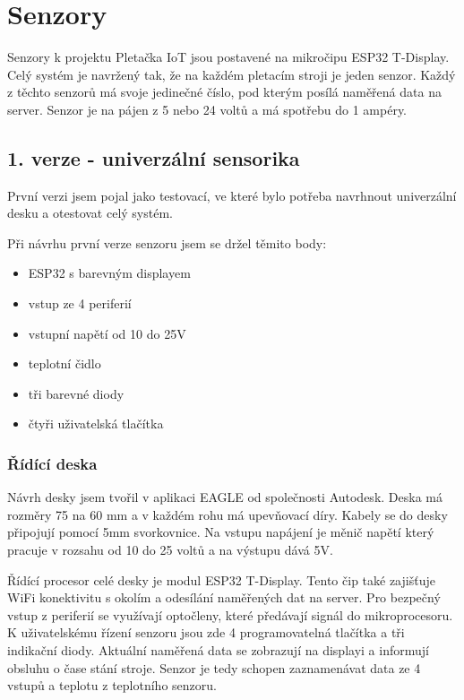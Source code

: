 \chapter{Senzory}

Senzory k projektu Pletačka IoT jsou postavené na mikročipu ESP32 T-Display\cite{ESP32}.
Celý systém je navržený tak, že na každém pletacím stroji je jeden senzor.
Každý z těchto senzorů má svoje jedinečné číslo, pod kterým posílá naměřená data na server.
Senzor je na pájen z 5 nebo 24 voltů a má spotřebu do 1 ampéry.


\section{1. verze - univerzální sensorika}

První verzi jsem pojal jako testovací, ve které bylo potřeba navrhnout univerzální desku a otestovat celý systém.\newline

Při návrhu první verze senzoru jsem se držel těmito body:
\begin{itemize}
    \item ESP32 s barevným displayem
    \item vstup ze 4 periferií
    \item vstupní napětí od 10 do 25V
    \item teplotní čidlo
    \item tři barevné diody
    \item čtyři uživatelská tlačítka
\end{itemize}


\subsection{Řídící deska}
Návrh desky jsem tvořil v aplikaci EAGLE od společnosti Autodesk. 
Deska má rozměry 75 na 60 mm a v každém rohu má upevňovací díry. 
Kabely se do desky připojují pomocí 5mm svorkovnice.
Na vstupu napájení je měnič napětí který pracuje v rozsahu od 10 do 25 voltů a na výstupu dává 5V. 

Řídící procesor celé desky je modul ESP32 T-Display.
Tento čip také zajišťuje WiFi konektivitu s okolím a odesílání naměřených dat na server.
Pro bezpečný vstup z periferií se využívají optočleny, které předávají signál do mikroprocesoru.
\fxnote[author=JA]{\textcolor{mygreen}{Optočlen}}
K uživatelskému řízení senzoru jsou zde 4 programovatelná tlačítka a tři indikační diody.
Aktuální naměřená data se zobrazují na displayi a informují obsluhu o čase stání stroje.
\fxnote[author=JA]{\textcolor{mygreen}{Čase stání stroje - napsat jinak}}
Senzor je tedy schopen zaznamenávat data ze 4 vstupů a teplotu z teplotního senzoru.


